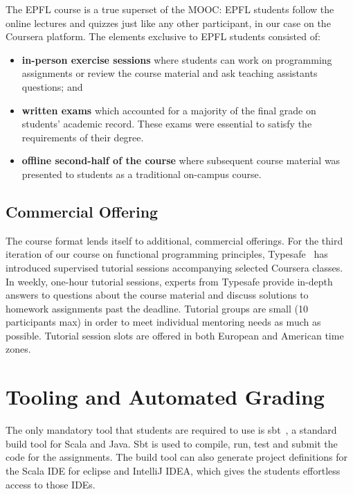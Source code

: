 \documentclass{sig-alternate}
\begin{document}
The EPFL course is a true superset of the MOOC: EPFL students follow the
online lectures and quizzes just like any other participant, in our
case on the Coursera platform. The elements exclusive to EPFL students
consisted of:

\begin{itemize}
\item {\bf in-person exercise sessions} where students can work on programming assignments or review the course material and ask teaching assistants questions; and
\item {\bf written exams} which accounted for a majority of the final grade on students'  academic record. These exams were essential to satisfy the requirements of
  their degree.
\item {\bf offline second-half of the course} where subsequent course material was presented to students as a traditional on-campus course.
\end{itemize}

\subsection{Commercial Offering}

The course format lends itself to additional, commercial offerings. For the
third iteration of our course on functional programming principles, Typesafe~\cite{typesafe}
has introduced supervised tutorial sessions accompanying selected Coursera
classes. In weekly, one-hour tutorial sessions, experts from Typesafe provide
in-depth answers to questions about the course material and discuss solutions
to homework assignments past the deadline. Tutorial groups are small (10
participants max) in order to meet individual mentoring needs as much as
possible. Tutorial session slots are offered in both European and American
time zones.

\section{Tooling and Automated Grading}
\label{sec:tooling-automated-grading}

The only mandatory tool that students are required to use is sbt~\cite{sbt}, a
standard build tool for Scala and Java. Sbt is used to compile, run, test and
submit the code for the assignments. The build tool can also generate project
definitions for the Scala IDE for eclipse and IntelliJ IDEA, which gives the
students effortless access to those IDEs.
\end{document}
